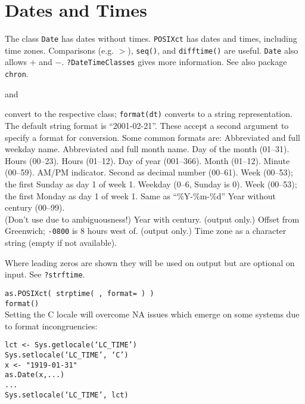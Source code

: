 \section{Dates and Times}{
The class {\tt Date} has dates without times.  {\tt POSIXct} has
dates and times, including time zones. Comparisons (e.g. $>$),
{\tt seq()}, and {\tt difftime()} are useful. {\tt Date} also allows
$+$ and $-$. {\tt ?DateTimeClasses} gives more information. See also package
{\tt chron}.}

	{and}

	{convert to the respective class; {\tt format(dt)} converts to a string representation. The default string format is ``2001-02-21''. These accept a second argument to specify a format for conversion. Some common formats are:}
	{Abbreviated and full \\weekday name.}
	{Abbreviated and full month name.}
	{Day of the month (01--31).}
	{Hours (00--23).}
	{Hours (01--12).}
	{Day of year (001--366).}
	{Month (01--12).}
	{Minute (00--59).}
	{AM/PM indicator. }
	{Second as decimal number (00--61).}
	{Week (00--53); the first Sunday as day 1 of week 1.}
	{Weekday (0--6, Sunday is 0).}
	{Week (00--53); the first Monday as day 1 of week 1.}
	{Same as ``\%Y-\%m-\%d''}
	{Year without century (00--99).\\(Don't use due to ambiguousness!)}
	{Year with century.}
	{(output only.) Offset from Greenwich; {\tt -0800} is 8 hours west of.}
	{(output only.) Time zone as a character
    string (empty if not available).}

Where leading zeros are shown they will be used on output but are
optional on input. See {\tt ?strftime}.

{\tt as.POSIXct( strptime( , format= ) )\\
    format()}\\

Setting the C locale will overcome NA issues which emerge on some systems due
to format incongruencies:

{\tt lct <- Sys.getlocale(`LC\_TIME')\\
Sys.setlocale(`LC\_TIME', `C')\\
x <- "1919-01-31"\\
as.Date(x,...)\\
...\\
Sys.setlocale(`LC\_TIME', lct)
}

